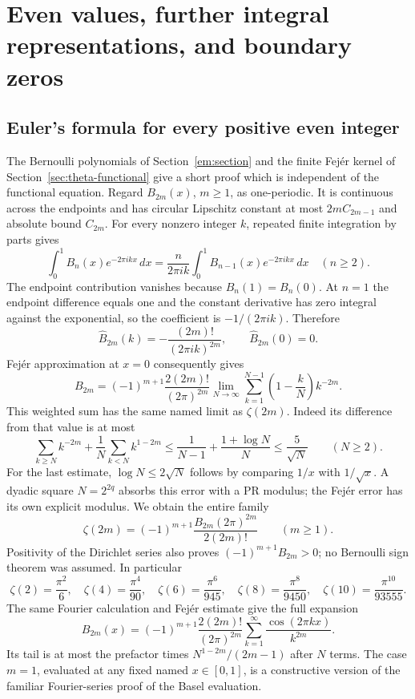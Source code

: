 \section{Even values, further integral representations, and boundary zeros}
\label{sec:additional}

\subsection{Euler's formula for every positive even integer}
\label{subsec:even-values}
The Bernoulli polynomials of Section~\ref{em:section} and the finite
Fej\'er kernel of Section~\ref{sec:theta-functional} give a short proof
which is independent of the functional equation. Regard $B_{2m}(x)$,
$m\ge1$, as one-periodic. It is continuous across the endpoints and
has circular Lipschitz constant at most $2m C_{2m-1}$ and absolute bound
$C_{2m}$. For every nonzero integer $k$, repeated finite integration by
parts gives
\[
 \int_0^1 B_n(x)e^{-2\pi ikx}\,dx
   =\frac{n}{2\pi ik}\int_0^1B_{n-1}(x)e^{-2\pi ikx}\,dx
       \quad(n\ge2).
\]
The endpoint contribution vanishes because $B_n(1)=B_n(0)$.
At $n=1$ the endpoint difference equals one and the constant derivative
has zero integral against the exponential, so the coefficient is
$-1/(2\pi ik)$. Therefore
\[
 \widehat B_{2m}(k)=-\frac{(2m)!}{(2\pi ik)^{2m}},\qquad
 \widehat B_{2m}(0)=0.
\]
Fej\'er approximation at $x=0$ consequently gives
\[
 B_{2m}=(-1)^{m+1}\frac{2(2m)!}{(2\pi)^{2m}}
       \lim_{N\to\infty}\sum_{k=1}^{N-1}
                  \left(1-\frac{k}{N}\right)k^{-2m}.
\]
This weighted sum has the same named limit as $\zeta(2m)$.
Indeed its difference from that value is at most
\[
 \sum_{k\ge N}k^{-2m}+\frac1N\sum_{k<N}k^{1-2m}
 \le\frac1{N-1}+\frac{1+\log N}{N}\le\frac5{\sqrt N}
       \qquad(N\ge2).
\]
For the last estimate, $\log N\le2\sqrt N$ follows by comparing
$1/x$ with $1/\sqrt x$. A dyadic square $N=2^{2q}$ absorbs this
error with a PR modulus; the Fej\'er error has its own explicit modulus.
We obtain the entire family
\begin{equation}
 \boxed{\displaystyle
 \zeta(2m)=(-1)^{m+1}\frac{B_{2m}(2\pi)^{2m}}{2(2m)!}
                 \qquad(m\ge1).}
 \label{eq:even-values}
\end{equation}
Positivity of the Dirichlet series also proves
$(-1)^{m+1}B_{2m}>0$; no Bernoulli sign theorem was assumed.
In particular
\[
 \zeta(2)=\frac{\pi^2}{6},\quad
 \zeta(4)=\frac{\pi^4}{90},\quad
 \zeta(6)=\frac{\pi^6}{945},\quad
 \zeta(8)=\frac{\pi^8}{9450},\quad
 \zeta(10)=\frac{\pi^{10}}{93555}.
\]
The same Fourier calculation and Fej\'er estimate give the full expansion
\[
 B_{2m}(x)=(-1)^{m+1}\frac{2(2m)!}{(2\pi)^{2m}}
           \sum_{k=1}^{\infty}\frac{\cos(2\pi kx)}{k^{2m}}.
\]
Its tail is at most the prefactor times
$N^{1-2m}/(2m-1)$ after $N$ terms. The case $m=1$, evaluated at any
fixed named $x\in[0,1]$, is a constructive version of the familiar
Fourier-series proof of the Basel evaluation.

